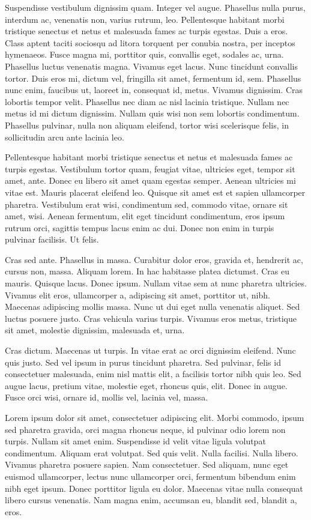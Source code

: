 Suspendisse vestibulum dignissim quam. Integer vel augue. Phasellus nulla purus, interdum ac, venenatis non, varius rutrum, leo. Pellentesque habitant morbi tristique senectus et netus et malesuada fames ac turpis egestas. Duis a eros. Class aptent taciti sociosqu ad litora torquent per conubia nostra, per inceptos hymenaeos. Fusce magna mi, porttitor quis, convallis eget, sodales ac, urna. Phasellus luctus venenatis magna. Vivamus eget lacus. Nunc tincidunt convallis tortor. Duis eros mi, dictum vel, fringilla sit amet, fermentum id, sem. Phasellus nunc enim, faucibus ut, laoreet in, consequat id, metus. Vivamus dignissim. Cras lobortis tempor velit. Phasellus nec diam ac nisl lacinia tristique. Nullam nec metus id mi dictum dignissim. Nullam quis wisi non sem lobortis condimentum. Phasellus pulvinar, nulla non aliquam eleifend, tortor wisi scelerisque felis, in sollicitudin arcu ante lacinia leo.

Pellentesque habitant morbi tristique senectus et netus et malesuada fames ac turpis egestas. Vestibulum tortor quam, feugiat vitae, ultricies eget, tempor sit amet, ante. Donec eu libero sit amet quam egestas semper. Aenean ultricies mi vitae est. Mauris placerat eleifend leo. Quisque sit amet est et sapien ullamcorper pharetra. Vestibulum erat wisi, condimentum sed, commodo vitae, ornare sit amet, wisi. Aenean fermentum, elit eget tincidunt condimentum, eros ipsum rutrum orci, sagittis tempus lacus enim ac dui. Donec non enim in turpis pulvinar facilisis. Ut felis.

Cras sed ante. Phasellus in massa. Curabitur dolor eros, gravida et, hendrerit ac, cursus non, massa. Aliquam lorem. In hac habitasse platea dictumst. Cras eu mauris. Quisque lacus. Donec ipsum. Nullam vitae sem at nunc pharetra ultricies. Vivamus elit eros, ullamcorper a, adipiscing sit amet, porttitor ut, nibh. Maecenas adipiscing mollis massa. Nunc ut dui eget nulla venenatis aliquet. Sed luctus posuere justo. Cras vehicula varius turpis. Vivamus eros metus, tristique sit amet, molestie dignissim, malesuada et, urna.

Cras dictum. Maecenas ut turpis. In vitae erat ac orci dignissim eleifend. Nunc quis justo. Sed vel ipsum in purus tincidunt pharetra. Sed pulvinar, felis id consectetuer malesuada, enim nisl mattis elit, a facilisis tortor nibh quis leo. Sed augue lacus, pretium vitae, molestie eget, rhoncus quis, elit. Donec in augue. Fusce orci wisi, ornare id, mollis vel, lacinia vel, massa.

Lorem ipsum dolor sit amet, consectetuer adipiscing elit. Morbi commodo, ipsum sed pharetra gravida, orci magna rhoncus neque, id pulvinar odio lorem non turpis. Nullam sit amet enim. Suspendisse id velit vitae ligula volutpat condimentum. Aliquam erat volutpat. Sed quis velit. Nulla facilisi. Nulla libero. Vivamus pharetra posuere sapien. Nam consectetuer. Sed aliquam, nunc eget euismod ullamcorper, lectus nunc ullamcorper orci, fermentum bibendum enim nibh eget ipsum. Donec porttitor ligula eu dolor. Maecenas vitae nulla consequat libero cursus venenatis. Nam magna enim, accumsan eu, blandit sed, blandit a, eros.

